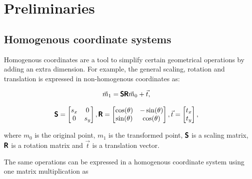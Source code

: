 \chapter{Preliminaries}

\label{chapter:preliminaries}
\section{Homogenous coordinate systems}

Homogenous coordinates are a tool to simplify certain geometrical operations by adding an extra dimension.
For example, the general scaling, rotation and translation is expressed in non-homogenous coordinates as:

\begin{equation}
    \vec{m}_1 = 
    \pmb{\mathsf{S}} \pmb{\mathsf{R}}
    \vec{m}_0
    + \vec{t},
\end{equation}

\begin{equation}
    \pmb{\mathsf{S}} = \begin{bmatrix} s_x & 0 \\ 0 & s_y \end{bmatrix}, \pmb{\mathsf{R}} = \begin{bmatrix} \cos(\theta) & -\sin(\theta) \\ \sin(\theta) & \cos(\theta) \end{bmatrix}, \vec{t} = \begin{bmatrix} t_x \\ t_y \end{bmatrix},
\end{equation}

where $m_0$ is the original point,
$m_1$ is the transformed point, 
$\pmb{\mathsf{S}}$ is a scaling matrix,
$\pmb{\mathsf{R}}$ is a rotation matrix and 
$\vec{t}$ is a translation vector.

The same operations can be expressed in a homogenous coordinate system using one matrix multiplication as


